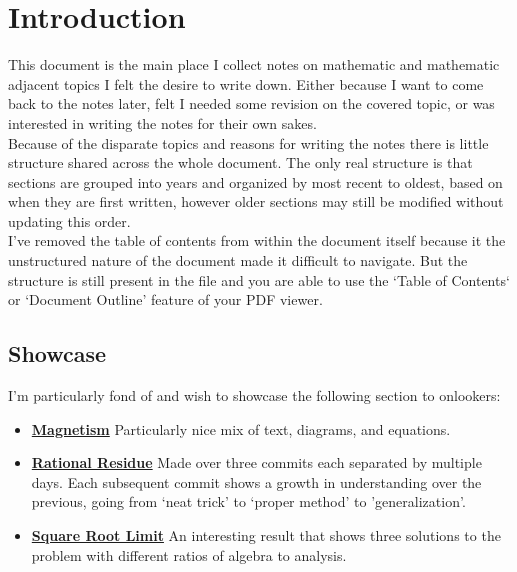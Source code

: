
\section{Introduction}
This document is the main place I collect notes on mathematic and mathematic adjacent topics I felt the desire to write down.
Either because I want to come back to the notes later,
felt I needed some revision on the covered topic,
or was interested in writing the notes for their own sakes.
\\

Because of the disparate topics and reasons for writing the notes there is little structure shared across the whole document.
The only real structure is that sections are grouped into years and organized by most recent to oldest,
based on when they are first written,
however older sections may still be modified without updating this order.
\\

I've removed the table of contents from within the document itself because it the unstructured nature of the document made it difficult to navigate.
But the structure is still present in the file and you are able to use the `Table of Contents` or `Document Outline' feature of your PDF viewer. 

\subsection{Showcase}
I'm particularly fond of and wish to showcase the following section to onlookers:
\begin{itemize}
	\item \hyperref[showcase:magnetism]{\bf Magnetism} 
		Particularly nice mix of text, diagrams, and equations.
	\item \hyperref[showcase:rational_residue]{\bf Rational Residue} 
		Made over three commits each separated by multiple days. 
		Each subsequent commit shows a growth in understanding over the previous,
		going from `neat trick' to `proper method' to 'generalization'.
	\item \hyperref[showcase:sqrt_limit]{\bf Square Root Limit} 
		An interesting result that shows three solutions to the problem with different ratios of algebra to analysis.
\end{itemize}
